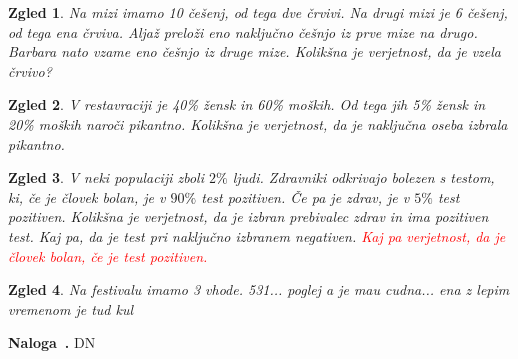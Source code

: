 \documentclass{article}
\newcounter{example}[section]
\newenvironment{example}[1][]{\refstepcounter{example}\par\medskip
   \noindent \textbf{Naloga~\theexample. #1} \rmfamily}{\medskip}
\newtheorem*{zgled}{Zgled}
\begin{document}
\begin{zgled}
    Na mizi imamo 10 češenj, od tega dve črvivi. Na drugi mizi je 6 češenj, od tega ena črviva. Aljaž preloži eno naključno češnjo iz prve mize na drugo. Barbara nato vzame eno češnjo iz druge mize. Kolikšna je verjetnost, da je vzela črvivo?
\end{zgled}

\begin{zgled}
    V restavraciji je 40\% žensk in 60\% moških. Od tega jih 5\% žensk in 20\% moških naroči pikantno. Kolikšna je verjetnost, da je naključna oseba izbrala pikantno.
\end{zgled}

\begin{zgled}
    V neki populaciji zboli $2\%$ ljudi. Zdravniki odkrivajo bolezen s testom, ki, če je človek bolan, je v $90\%$ test pozitiven. Če pa je zdrav, je v $5\%$ test pozitiven. Kolikšna je verjetnost, da je izbran prebivalec zdrav in ima pozitiven test. Kaj pa, da je test pri naključno izbranem negativen. \textcolor{red}{Kaj pa verjetnost, da je človek bolan, če je test pozitiven.}
\end{zgled}

\begin{zgled}
    Na festivalu imamo 3 vhode. 531... poglej a je mau cudna... ena z lepim vremenom je tud kul
\end{zgled}

\begin{example}
    DN 
\end{example}
\end{document}
